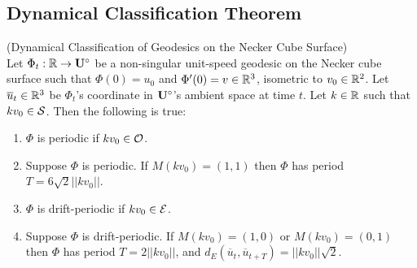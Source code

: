 \documentclass[]{article}
\begin{document}
\subsection{Dynamical Classification Theorem}
\begin{thm*}
(Dynamical Classification of Geodesics on the Necker Cube Surface) \\Let $\Phi_t:\mathbb{R}\rightarrow\mathbf{U}^\circ$ be a non-singular unit-speed geodesic on the Necker cube surface such that $\Phi(0)=u_0$ and $\Phi'(0)=v\in\mathbb{R}^3$, isometric to $v_0\in\mathbb{R}^2$. Let $\overline{u}_t\in\mathbb{R}^3$ be $\Phi_t$'s coordinate in $\mathbf{U}^\circ$'s ambient space at time $t$. Let $k\in\mathbb{R}$ such that $kv_0\in\mathcal{S}$. Then the following is true:
\begin{enumerate}[label=(\roman*)]
\item $\Phi$ is periodic if $kv_0\in\mathcal{O}$.
\item Suppose $\Phi$ is periodic. If $M (kv_0)=(1,1)$ then $\Phi$ has period $T=6\sqrt{2}||kv_0||$.
\item $\Phi$ is drift-periodic if $kv_0\in\mathcal{E}$. 
\item Suppose $\Phi$ is drift-periodic. If $M (kv_0)=(1,0)$ or $M (kv_0)=(0,1)$ then $\Phi$ has period $T=2||kv_0||$, and $d_E(\overline{u}_t,\overline{u}_{t+T})=||kv_0||\sqrt{2}$.
\end{enumerate}
\end{thm*}

\newpage
~
\newpage
\end{document}
